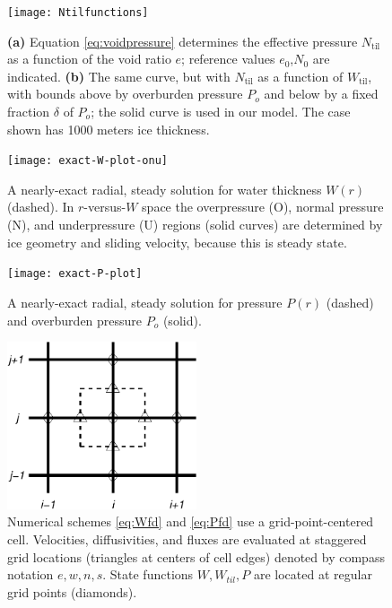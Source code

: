 \documentclass[gmd]{copernicus}   %
\begin{document}

\begin{figure}[ht]
\texttt{[image: Ntilfunctions]}
\caption{\textbf{(a)} Equation \eqref{eq:voidpressure} determines the effective pressure $N_{\text{til}}$ as a function of the void ratio $e$; reference values $e_0$,$N_0$ are indicated.  \textbf{(b)}  The same curve, but with $N_{\text{til}}$ as a function of $W_{\text{til}}$, with bounds above by overburden pressure $P_o$ and below by a fixed fraction $\delta$ of $P_o$; the solid curve is used in our model.  The case shown has 1000 meters ice thickness.}
\label{fig:Ntilfunctions}
\end{figure}

\begin{figure}[ht]
\texttt{[image: exact-W-plot-onu]}
\caption{A nearly-exact radial, steady solution for water thickness $W(r)$ (dashed).  In $r$-versus-$W$ space the overpressure (O), normal pressure (N), and underpressure (U) regions (solid curves) are determined by ice geometry and sliding velocity, because this is steady state.}
\label{fig:Wexact}
\end{figure}

\begin{figure}[ht]
\texttt{[image: exact-P-plot]}
\caption{A nearly-exact radial, steady solution for pressure $P(r)$ (dashed) and overburden pressure $P_o$ (solid).}
\label{fig:Pexact}
\end{figure}

\begin{figure}[ht]
\centering
\includegraphics[width=2.2in,keepaspectratio=true]{diffstencil}
\bigskip
\caption{Numerical schemes \eqref{eq:Wfd} and \eqref{eq:Pfd} use a grid-point-centered cell.  Velocities, diffusivities, and fluxes are evaluated at staggered grid locations (triangles at centers of cell edges) denoted by compass notation $e,w,n,s$.  State functions $W,W_{til},P$ are located at regular grid points (diamonds).}
\label{fig:stencil}
\end{figure}
\end{document}

